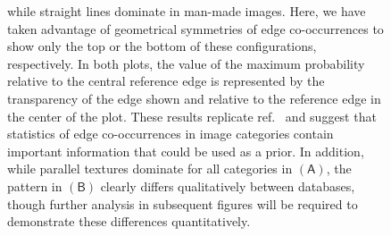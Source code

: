 \documentclass[a4paper]{article}
\begin{document}
\begin{figure}
{while straight lines dominate in man-made images. 
Here, we have taken advantage of geometrical symmetries of edge co-occurrences 
to show only the top or the bottom of these configurations, respectively.
In both plots, the value of the maximum probability relative to the central reference edge 
is represented by the transparency of the edge shown and relative 
to the reference edge in the center of the plot. 
These results replicate ref.~\autocite{Geisler01} 
and suggest that statistics of edge co-occurrences in image categories
contain important information that could be used as a prior. 
In addition, while parallel textures dominate for all categories in $\mathsf{(A)}$, 
the pattern in $\mathsf{(B)}$ clearly differs qualitatively between databases, 
though further analysis in subsequent figures will be required 
to demonstrate these differences quantitatively.  
\label{fig:geisler} %
 } %
\end{figure} %
\end{document}
